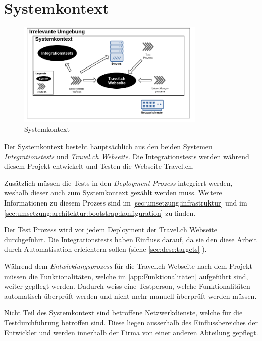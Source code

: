 \section{Systemkontext}
\begin{figure}[H]
	\centering
	\includegraphics[width=0.8\textwidth]{images/Semesterarbeit Systemkontext.png}
	\caption{Systemkontext}
	\label{fig:analyse:systemkontext}
\end{figure}
Der Systemkontext besteht hauptsächlich aus den beiden Systemen \textit{Integrationstests} und \textit{Travel.ch Webseite}. Die Integrationstests werden während diesem Projekt entwickelt und Testen die Webseite Travel.ch.

Zusätzlich müssen die Tests in den \textit{Deployment Prozess} integriert werden, weshalb dieser auch zum Systemkontext gezählt werden muss. Weitere Informationen zu diesem Prozess sind im \cref{sec:umsetzung:infrastruktur}  und im \cref{sec:umsetzung:architektur:bootstrap:konfiguration}  zu finden.

Der Test Prozess wird vor jedem Deployment der Travel.ch Webseite durchgeführt. Die Integrationstests haben Einfluss darauf, da sie den diese Arbeit durch Automatisation erleichtern sollen (siehe \cref{sec:desc:targets} ).

Während dem \textit{Entwicklungsprozess} für die Travel.ch Webseite nach dem Projekt müssen die Funktionalitäten, welche im \cref{app:Funktionalitäten}  aufgeführt sind, weiter gepflegt werden. Dadurch weiss eine Testperson, welche Funktionalitäten automatisch überprüft werden und nicht mehr manuell überprüft werden müssen.

Nicht Teil des Systemkontext sind betroffene Netzwerkdienste, welche für die Testdurchführung betroffen sind. Diese liegen ausserhalb des Einflussbereiches der Entwickler und werden innerhalb der Firma von einer anderen Abteilung gepflegt.

